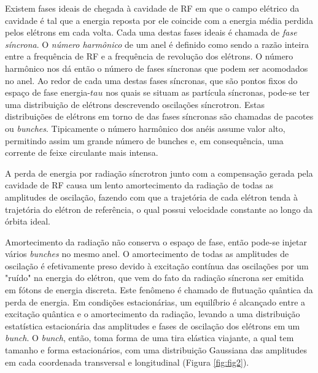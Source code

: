 Existem fases ideais de chegada à cavidade de RF em que o campo elétrico da cavidade é tal que a energia reposta por ele coincide com a energia média perdida pelos elétrons em cada volta. Cada uma destas fases ideais é chamada de \emph{fase síncrona}. O \emph{número harmônico} de um anel é definido como sendo a razão inteira entre a frequência de RF e a frequência de revolução dos elétrons. O número harmônico nos dá então o número de fases síncronas que podem ser acomodados no anel. Ao redor de cada uma destas fases síncronas, que são pontos fixos do espaço de fase energia-$tau$ nos quais se situam as partícula síncronas, pode-se ter uma distribuição de elétrons descrevendo oscilações síncrotron. Estas distribuições de elétrons em torno de das fases síncronas são chamadas de pacotes ou \emph{bunches}. Tipicamente o número harmônico dos anéis assume valor alto, permitindo assim um grande número de bunches e, em consequência, uma corrente de feixe circulante mais intensa.
	
A perda de energia por radiação síncrotron junto com a compensação gerada pela cavidade de RF causa um lento amortecimento da radiação de todas as amplitudes de oscilação, fazendo com que a trajetória de cada elétron tenda à trajetória do elétron de referência, o qual possui velocidade constante ao longo da órbita ideal.
	
Amortecimento da radiação não conserva o espaço de fase, então pode-se injetar vários \textit{bunches} no mesmo anel. O amortecimento de todas as amplitudes de oscilação é efetivamente preso devido à excitação contínua das oscilações por um "ruído" na energia do elétron, que vem do fato da radiação síncrona ser emitida em fótons de energia discreta. Este fenômeno é chamado de flutuação quântica da perda de energia. Em condições estacionárias, um equilíbrio é alcançado entre a excitação quântica e o amortecimento da radiação, levando a uma distribuição estatística estacionária das amplitudes e fases de oscilação dos elétrons em um \textit{bunch}. O \textit{bunch}, então, toma forma de uma tira elástica viajante, a qual tem tamanho e forma estacionários, com uma distribuição Gaussiana das amplitudes em cada coordenada transversal e longitudinal (Figura \ref{fig:fig2}). 
	
